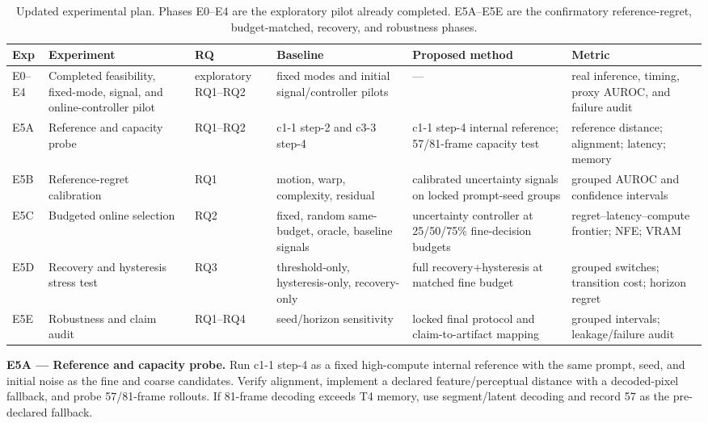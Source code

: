 \documentclass[11pt,a4paper]{article}
\begin{document}
\begin{table}[t]
\centering
\small
\renewcommand{\arraystretch}{1.35}
\begin{tabularx}{\textwidth}{>{\raggedright\arraybackslash}p{0.9cm} >{\raggedright\arraybackslash}p{2.9cm} >{\raggedright\arraybackslash}p{1.7cm} >{\raggedright\arraybackslash}X >{\raggedright\arraybackslash}X >{\raggedright\arraybackslash}p{2.6cm}}
\toprule
\textbf{Exp} & \textbf{Experiment} & \textbf{RQ} & \textbf{Baseline} & \textbf{Proposed method} & \textbf{Metric} \\
\midrule
E0--E4 & Completed feasibility, fixed-mode, signal, and online-controller pilot & exploratory RQ1--RQ2 & fixed modes and initial signal/controller pilots & --- & real inference, timing, proxy AUROC, and failure audit \\
E5A & Reference and capacity probe & RQ1--RQ2 & c1-1 step-2 and c3-3 step-4 & c1-1 step-4 internal reference; 57/81-frame capacity test & reference distance; alignment; latency; memory \\
E5B & Reference-regret calibration & RQ1 & motion, warp, complexity, residual & calibrated uncertainty signals on locked prompt-seed groups & grouped AUROC and confidence intervals \\
E5C & Budgeted online selection & RQ2 & fixed, random same-budget, oracle, baseline signals & uncertainty controller at 25/50/75\% fine-decision budgets & regret--latency--compute frontier; NFE; VRAM \\
E5D & Recovery and hysteresis stress test & RQ3 & threshold-only, hysteresis-only, recovery-only & full recovery+hysteresis at matched fine budget & grouped switches; transition cost; horizon regret \\
E5E & Robustness and claim audit & RQ1--RQ4 & seed/horizon sensitivity & locked final protocol and claim-to-artifact mapping & grouped intervals; leakage/failure audit \\
\bottomrule
\end{tabularx}
\caption{Updated experimental plan. Phases E0--E4 are the exploratory pilot already completed. E5A--E5E are the confirmatory reference-regret, budget-matched, recovery, and robustness phases.}
\label{tab:experiments}
\end{table}
\FloatBarrier

\textbf{E5A --- Reference and capacity probe.} Run c1-1 step-4 as a fixed high-compute internal reference with the same prompt, seed, and initial noise as the fine and coarse candidates. Verify alignment, implement a declared feature/perceptual distance with a decoded-pixel fallback, and probe 57/81-frame rollouts. If 81-frame decoding exceeds T4 memory, use segment/latent decoding and record 57 as the pre-declared fallback.
\end{document}

